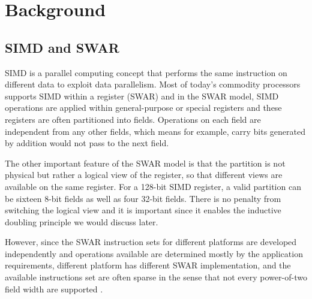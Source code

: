 %
%

\chapter{Background}
\label{two}

\section{SIMD and SWAR}
SIMD is a parallel computing concept that performs the same instruction on different data to exploit data parallelism. Most of today's commodity processors supports SIMD within a register (SWAR) and in the SWAR model, SIMD operations are applied within general-purpose or special registers and these registers are often partitioned into fields. Operations on each field are independent from any other fields, which means for example, carry bits generated by addition would not pass to the next field.

The other important feature of the SWAR model is that the partition is not physical but rather a logical view of the register, so that different views are available on the same register. For a 128-bit SIMD register, a valid partition can be sixteen 8-bit fields as well as four 32-bit fields. There is no penalty from switching the logical view and it is important since it enables the inductive doubling principle we would discuss later.

However, since the SWAR instruction sets for different platforms are developed independently and operations available are determined mostly by the application requirements, different platform has different SWAR implementation, and the available instructions set are often sparse in the sense that not every power-of-two field width are supported \cite{hybrid_simd_type_legalize}.

